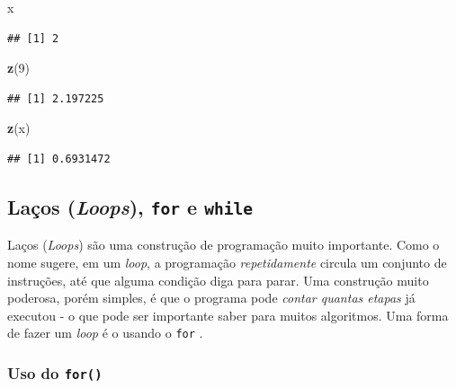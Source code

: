 \documentclass[
]{book}
\newenvironment{Shaded}{\begin{snugshade}}{\end{snugshade}}
\newcommand{\DecValTok}[1]{\textcolor[rgb]{0.00,0.00,0.81}{#1}}
\newcommand{\KeywordTok}[1]{\textcolor[rgb]{0.13,0.29,0.53}{\textbf{#1}}}
\newcommand{\NormalTok}[1]{#1}
\theoremstyle{definition}
\theoremstyle{definition}
\theoremstyle{definition}
\theoremstyle{remark}
\begin{document}
\begin{Shaded}
\begin{Highlighting}[]
\NormalTok{x}
\end{Highlighting}
\end{Shaded}

\begin{verbatim}
## [1] 2
\end{verbatim}

\begin{Shaded}
\begin{Highlighting}[]
\KeywordTok{z}\NormalTok{(}\DecValTok{9}\NormalTok{)}
\end{Highlighting}
\end{Shaded}

\begin{verbatim}
## [1] 2.197225
\end{verbatim}

\begin{Shaded}
\begin{Highlighting}[]
\KeywordTok{z}\NormalTok{(x)}
\end{Highlighting}
\end{Shaded}

\begin{verbatim}
## [1] 0.6931472
\end{verbatim}

\hypertarget{lauxe7os-loops-for-e-while}{%
\subsection{\texorpdfstring{Laços (\emph{Loops}), \texttt{for} e \texttt{while}}{Laços (Loops), for e while}}\label{lauxe7os-loops-for-e-while}}

Laços (\emph{Loops}) são uma construção de programação muito importante. Como o nome sugere, em um \emph{loop}, a programação \emph{repetidamente} circula um conjunto de instruções, até que alguma condição diga para parar. Uma construção muito poderosa, porém simples, é que o programa pode \emph{contar quantas etapas} já executou - o que pode ser importante saber para muitos algoritmos. Uma forma de fazer um \emph{loop} é o usando o \texttt{for} .

\hypertarget{uso-do-for}{%
\subsubsection{\texorpdfstring{Uso do \texttt{for()}}{Uso do for()}}\label{uso-do-for}}
\end{document}

